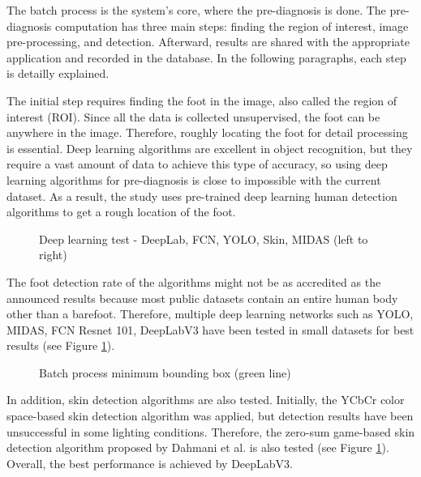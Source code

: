 The batch process is the system's core, where the pre-diagnosis is done. The pre-diagnosis computation has three main steps: finding the region of interest, image pre-processing, and detection. Afterward, results are shared with the appropriate application and recorded in the database. In the following paragraphs, each step is detailly explained.

The initial step requires finding the foot in the image, also called the region of interest (ROI). Since all the data is collected unsupervised, the foot can be anywhere in the image. Therefore, roughly locating the foot for detail processing is essential. Deep learning algorithms are excellent in object recognition, but they require a vast amount of data to achieve this type of accuracy, so using deep learning algorithms for pre-diagnosis is close to impossible with the current dataset. As a result, the study uses pre-trained deep learning human detection algorithms to get a rough location of the foot.

\begin{figure}[htbp]
\centering
{}
\caption{Deep learning test - DeepLab, FCN, YOLO, Skin, MIDAS (left to right)}
\label{fig:DeepLearningTest}
\end{figure}

The foot detection rate of the algorithms might not be as accredited as the announced results because most public datasets contain an entire human body other than a barefoot. Therefore, multiple deep learning networks such as YOLO, MIDAS, FCN Resnet 101, DeepLabV3 have been tested in small datasets for best results (see Figure \ref{fig:DeepLearningTest}).

\begin{figure}[htbp]
\centering
{}
\caption{Batch process minimum bounding box (green line)}
\label{fig:BatchProcessMinimumBoundingBox}
\end{figure}

In addition, skin detection algorithms are also tested. Initially, the YCbCr color space-based skin detection algorithm was applied, but detection results have been unsuccessful in some lighting conditions. Therefore, the zero-sum game-based skin detection algorithm proposed by Dahmani et al. \cite{dahmani2020zero} is also tested (see Figure \ref{fig:DeepLearningTest}). Overall, the best performance is achieved by DeepLabV3.

